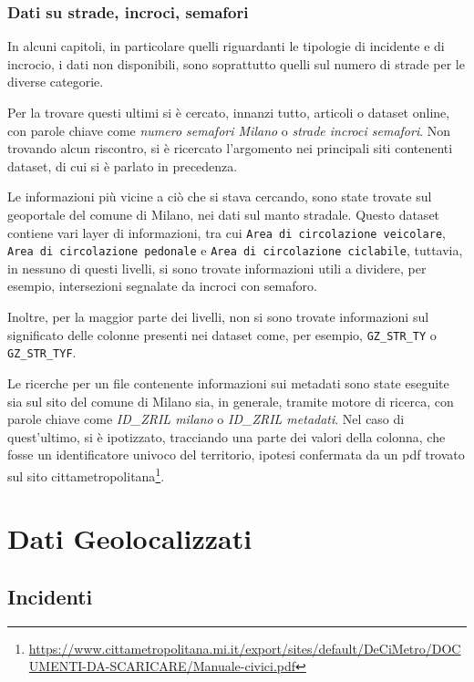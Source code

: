 \documentclass[a4paper,12pt]{report}
\newcommand{\columnstyle}[1]{\texttt{#1}}
\newcommand{\quotestyle}[1]{\textit{#1}}
\begin{document}
\subsection{Dati su strade, incroci, semafori}

In alcuni capitoli, in particolare quelli riguardanti le tipologie di incidente e 
di incrocio, i dati non disponibili, sono soprattutto quelli sul 
numero di strade per le diverse categorie.

Per la trovare questi ultimi si è cercato, innanzi tutto, articoli o dataset online, con 
parole chiave come \quotestyle{numero semafori Milano} o \quotestyle{strade incroci semafori}.
Non trovando alcun riscontro, si è ricercato l'argomento nei principali siti contenenti 
dataset, di cui si è parlato in precedenza. 

Le informazioni più vicine a ciò che si stava cercando, 
sono state trovate sul geoportale 
del comune di Milano, nei dati sul manto stradale.
Questo dataset contiene vari layer di informazioni, tra cui 
\columnstyle{Area di circolazione veicolare}, 
\columnstyle{Area di circolazione pedonale} e \columnstyle{Area di circolazione ciclabile}, 
tuttavia, in nessuno di questi livelli, si sono trovate informazioni utili a dividere, 
per esempio, intersezioni segnalate da incroci con semaforo. 

Inoltre, per la maggior parte dei livelli, non si sono trovate informazioni sul significato 
delle colonne presenti nei dataset come, per esempio, \columnstyle{GZ\_STR\_TY} o 
\columnstyle{GZ\_STR\_TYF}. 

Le ricerche per un file contenente informazioni sui metadati sono state eseguite sia 
sul sito del comune di Milano sia, in generale, tramite motore di ricerca, con parole chiave 
come \quotestyle{ID\_ZRIL milano} o \quotestyle{ID\_ZRIL metadati}. 
Nel caso di quest'ultimo, si è ipotizzato, tracciando una parte dei valori della colonna, 
che fosse un identificatore univoco del territorio, ipotesi confermata da un pdf trovato sul sito 
cittametropolitana\footnote{\url{https://www.cittametropolitana.mi.it/export/sites/default/DeCiMetro/DOCUMENTI-DA-SCARICARE/Manuale-civici.pdf}}. 

\chapter{Dati Geolocalizzati}

\section{Incidenti}
\end{document}
